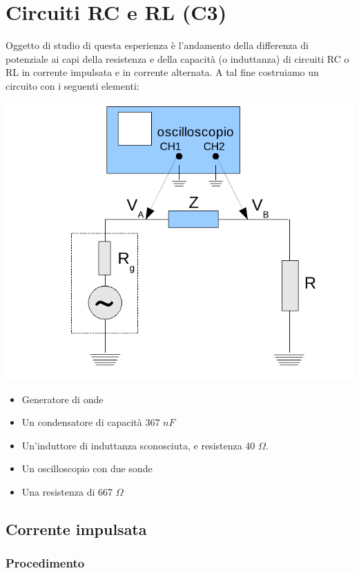 \chapter{Circuiti RC e RL (C3)}

Oggetto di studio di questa esperienza è l'andamento della differenza di potenziale ai capi della resistenza e della capacità (o induttanza) di circuiti RC o RL in corrente impulsata e in corrente alternata.
A tal fine costruiamo un circuito con i seguenti elementi:

\begin{center}
 \includegraphics[scale=0.70]{grafici/C3/schema.png}
\end{center}

\begin{itemize}
  \item Generatore di onde
  \item Un condensatore di capacità 367 $nF$
  \item Un'induttore di induttanza sconosciuta, e resistenza 40 $\Omega$.
  \item Un oscilloscopio con due sonde
  \item Una resistenza di 667 $\Omega$ 
\end{itemize}

\section{Corrente impulsata}
\subsection{Procedimento}


